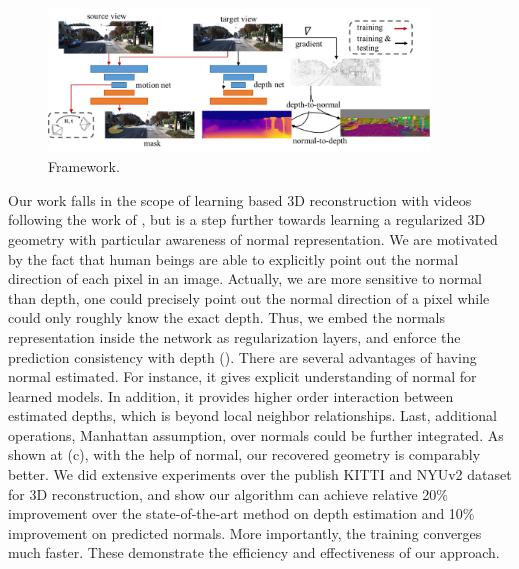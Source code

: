 \begin{figure}[t]
\centering
\includegraphics[width=0.9\textwidth]{figures/pipeline.pdf}
\caption{Framework.}
\label{fig:pipeline}
\end{figure}
Our work falls in the scope of learning based 3D reconstruction with videos following the work of \cite{zhou2017unsupervised}, but is a step further towards learning a regularized 3D geometry with particular awareness of normal representation. 
We are motivated by the fact that human beings are able to explicitly point out the normal direction of each pixel in an image. Actually, we are more sensitive to normal than depth, \eg one could precisely point out the normal direction of a pixel while could only roughly know the exact depth. 
Thus, we embed the normals representation inside the network as regularization layers, and enforce the prediction consistency with depth ().
There are several advantages of having normal estimated. For instance, it gives explicit understanding of normal for learned models.  In addition, it provides higher order interaction between estimated depths, which is beyond local neighbor relationships. Last, additional operations, \eg Manhattan assumption, over normals could be further integrated.
As shown at (c), with the help of normal, our recovered geometry is comparably better. We did extensive experiments over the publish KITTI and NYUv2 dataset for 3D reconstruction, and show our algorithm can achieve relative 20$\%$ improvement over the state-of-the-art method on depth estimation and 10$\%$ improvement on predicted normals. More importantly, the training converges much faster. These demonstrate the efficiency and effectiveness of our approach.



